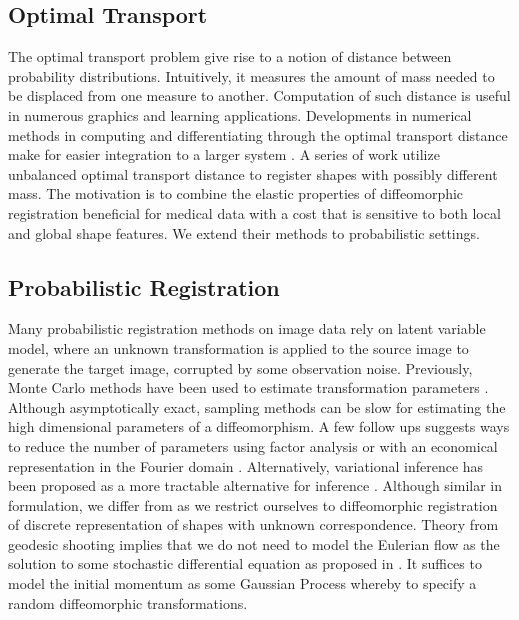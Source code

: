 \documentclass{6838publ}
\begin{document}
\subsection{Optimal Transport}

The optimal transport problem give rise to a notion of distance between probability distributions. Intuitively, it measures the amount of mass needed to be displaced from one measure to another. Computation of such distance is useful in numerous graphics \cite{degoesOptimalTransportApproach2011,degoesBlueNoiseOptimal2012,solomonConvolutionalWassersteinDistances2015} and learning \cite{frognerLearningWassersteinLoss2015, janatiSpatioTemporalAlignmentsOptimal2020} applications. Developments in numerical methods in computing and differentiating through the optimal transport distance make for easier integration to a larger system \cite{cuturiSinkhornDistancesLightspeed2013,altschulerNearlinearTimeApproximation2018,genevayLearningGenerativeModels2018,schmitzerStabilizedSparseScaling2019}. A series of work \cite{feydyOptimalTransportDiffeomorphic2017a,feydyFastScalableOptimal2019} utilize unbalanced optimal transport distance to register shapes with possibly different mass. The motivation is to combine the elastic properties of diffeomorphic registration beneficial for medical data with a cost that is sensitive to both local and global shape features. We extend their methods to probabilistic settings.


\subsection{Probabilistic Registration}

Many probabilistic registration methods on image data rely on latent variable model, where an unknown transformation is applied to the source image to generate the target image, corrupted by some observation noise. Previously, Monte Carlo methods have been used to estimate transformation parameters \cite{risholmBayesianCharacterizationUncertainty2013,zhangBayesianEstimationRegularization2013}. Although asymptotically exact, sampling methods can be slow for estimating the high dimensional parameters of a diffeomorphism. A few follow ups suggests ways to reduce the number of parameters using factor analysis \cite{risholmBayesianCharacterizationUncertainty2013} or with an economical representation in the Fourier domain \cite{wangRegistrationUncertaintyQuantification2019}. Alternatively, variational inference has been proposed as a more tractable alternative for inference \cite{wassermannProbabilisticDiffeomorphicRegistration2014,dalcaUnsupervisedLearningProbabilistic2019}. Although similar in formulation, we differ from \cite{wassermannProbabilisticDiffeomorphicRegistration2014} as we restrict ourselves to diffeomorphic registration of discrete representation of shapes with unknown correspondence. Theory from geodesic shooting implies that we do not need to model the Eulerian flow as the solution to some stochastic differential equation as proposed in \cite{wassermannProbabilisticDiffeomorphicRegistration2014}. It suffices to model the initial momentum as some Gaussian Process whereby to specify a random diffeomorphic transformations.
\end{document}
